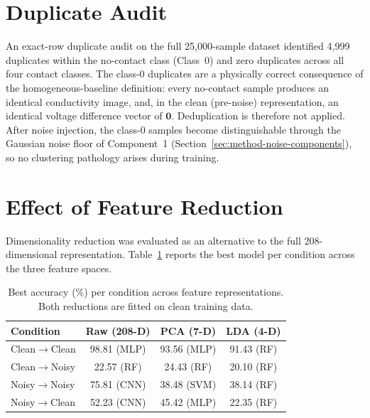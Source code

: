 \section{Duplicate Audit}
\label{app:eda-duplicates}

An exact-row duplicate audit on the full 25{,}000-sample dataset identified 4{,}999 duplicates within the no-contact class (Class~0) and zero duplicates across all four contact classes. The class-0 duplicates are a physically correct consequence of the homogeneous-baseline definition: every no-contact sample produces an identical conductivity image, and, in the clean (pre-noise) representation, an identical voltage difference vector of $\mathbf{0}$. Deduplication is therefore not applied. After noise injection, the class-0 samples become distinguishable through the Gaussian noise floor of Component~1 (Section~\ref{sec:method-noise-components}), so no clustering pathology arises during training.

\section{Effect of Feature Reduction}
\label{app:feature-reduction}

Dimensionality reduction was evaluated as an alternative to the full 208-dimensional representation. Table~\ref{tab:feature-reduction} reports the best model per condition across the three feature spaces.

\begin{table}[htbp]
\centering
\caption[Best accuracy per condition across feature representations]{Best accuracy (\%) per condition across feature representations. Both reductions are fitted on clean training data.}
\label{tab:feature-reduction}
\small
\begin{tabular}{@{}lccc@{}}
\toprule
\textbf{Condition} & \textbf{Raw (208-D)} & \textbf{PCA (7-D)} & \textbf{LDA (4-D)} \\
\midrule
Clean$\to$Clean & 98.81 (MLP) & 93.56 (MLP) & 91.43 (RF) \\
Clean$\to$Noisy & 22.57 (RF)  & 24.43 (RF)  & 20.10 (RF) \\
Noisy$\to$Noisy & 75.81 (CNN) & 38.48 (SVM) & 38.14 (RF) \\
Noisy$\to$Clean & 52.23 (CNN) & 45.42 (MLP) & 22.35 (RF) \\
\bottomrule
\end{tabular}
\end{table}

